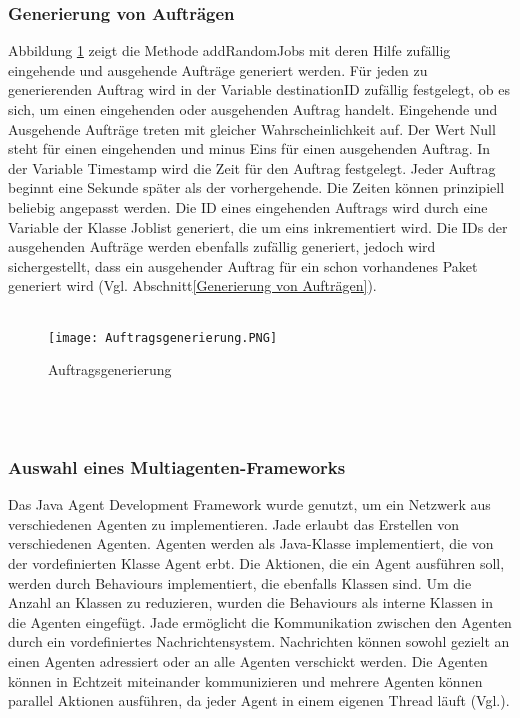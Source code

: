 \subsubsection{Generierung von Aufträgen}
Abbildung \ref{AGEN} zeigt die Methode addRandomJobs mit deren Hilfe zufällig eingehende und ausgehende Aufträge generiert werden. Für jeden zu generierenden Auftrag wird in der Variable destinationID zufällig festgelegt, ob es sich, um einen eingehenden oder ausgehenden Auftrag handelt.
Eingehende und Ausgehende Aufträge treten mit gleicher Wahrscheinlichkeit auf. Der Wert Null steht für einen eingehenden und minus Eins für einen ausgehenden Auftrag. In der Variable Timestamp wird die Zeit für den Auftrag festgelegt. Jeder Auftrag beginnt eine Sekunde später als der vorhergehende. Die Zeiten können prinzipiell beliebig angepasst werden. Die ID eines eingehenden Auftrags wird durch eine Variable der Klasse Joblist generiert, die um eins inkrementiert wird. Die IDs der ausgehenden Aufträge werden ebenfalls zufällig generiert, jedoch wird sichergestellt, dass ein ausgehender Auftrag für ein schon vorhandenes Paket generiert wird (Vgl. Abschnitt\ref{Generierung von Aufträgen}).
\\\\  
\begin{figure}[h!]
	\centering
		\texttt{[image: Auftragsgenerierung.PNG]}        
		\caption{Auftragsgenerierung}
	\label{AGEN}
\end{figure}
\\\\
\subsubsection{Auswahl eines Multiagenten-Frameworks}
Das Java Agent Development Framework wurde genutzt, um ein Netzwerk aus verschiedenen Agenten zu implementieren. Jade erlaubt das Erstellen von verschiedenen Agenten. Agenten werden als Java-Klasse implementiert, die von der vordefinierten Klasse Agent erbt. Die Aktionen, die ein Agent ausführen soll, werden durch Behaviours implementiert, die ebenfalls Klassen sind. Um die Anzahl an Klassen zu reduzieren, wurden die Behaviours als interne Klassen in die Agenten eingefügt. Jade ermöglicht die Kommunikation zwischen den Agenten durch ein vordefiniertes Nachrichtensystem. Nachrichten können sowohl gezielt an einen Agenten adressiert oder an alle Agenten verschickt werden. Die Agenten können in Echtzeit miteinander kommunizieren und mehrere Agenten können parallel Aktionen ausführen, da jeder Agent in einem eigenen Thread läuft (Vgl.\cite{jadetwo}). 
